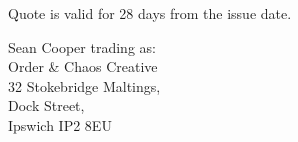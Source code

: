 \documentclass[11pt,a4paper]{letter}
\begin{document}
    \fontsize{9pt}{11pt}\selectfont
    {\semibold Quote is valid for 28 days from the issue date.}\\
    \vspace*{\fill}
    \begin{center}
    {\fontsize{8pt}{10pt}\selectfont
    Sean Cooper trading as:\\
    {\semiboldit Order \& Chaos Creative}\\
    32 Stokebridge Maltings,\\
    Dock Street,\\
    Ipswich IP2 8EU\\}
    \end{center}
\end{document}
